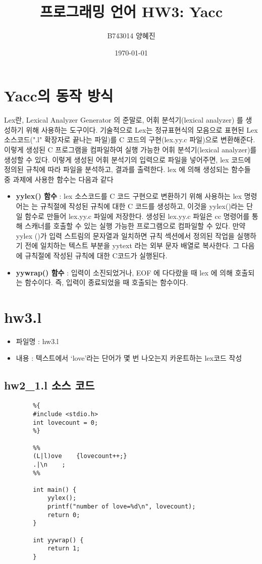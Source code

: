 \documentclass{article}
\begin{document}
\title{프로그래밍 언어 HW3: Yacc}
\author{B743014 양혜진}
\date{\today}
\maketitle

\section{Yacc의 동작 방식}
Lex란, Lexical Analyzer Generator 의 준말로, 어휘 분석기(lexical analyzer) 를 생성하기 위해
사용하는 도구이다. 기술적으로 Lex는 정규표현식의 모음으로 표현된 Lex 소스코드(".l" 확장자로 끝나는 파일)를
C 코드의 구현(lex.yy.c 파일)으로 변환해준다. 이렇게 생성된 C 프로그램을 컴파일하여 실행 가능한
어휘 분석기(lexical analyzer)를 생성할 수 있다. 이렇게 생성된 어휘 분석기의 입력으로
파일을 넣어주면, lex 코드에 정의된 규칙에 따라 파일을 분석하고, 결과를 출력한다.
lex 에 의해 생성되는 함수들 중 과제에 사용한 함수는 다음과 같다

\begin{itemize}
	\item {\bf yylex() 함수} : lex 소스코드를 C 코드 구현으로 변환하기 위해
	사용하는 lex 명령어는 는 규칙절에 작성된 규칙에 대한 C 코드를 생성하고, 이것을
	yylex()라는 단일 함수로 만들어 lex.yy.c 파일에 저장한다. 생성된
	lex.yy.c 파일은 cc 명령어를 통해 스캐너를 호출할 수 있는 실행 가능한
	프로그램으로 컴파일할 수 있다. 만약 yylex ()가 입력 스트림의 문자열과 일치하면 
	규칙 섹션에서 정의된 작업을 실행하기 전에 일치하는 텍스트 부분을 yytext 라는
	외부 문자 배열로 복사한다. 그 다음에 규칙절에 작성된 규칙에 대한 C코드가 실행된다.
	\item {\bf yywrap() 함수} : 입력이 소진되었거나, EOF 에 다다랐을 때
	lex 에 의해 호출되는 함수이다. 즉, 입력이 종료되었을 때 호출되는 함수이다.
\end{itemize}


\section{hw3.l}

\begin{itemize}
	\item 파일명 : hw3.l
	\item 내용 : 텍스트에서 ‘love’라는 단어가 몇 번 나오는지 카운트하는 lex코드 작성
\end{itemize}

\subsection{hw2\_1.l 소스 코드}
\begin{lstlisting}
		%{
		#include <stdio.h>
		int lovecount = 0;
		%}
		
		%%
		(L|l)ove	{lovecount++;}
		.|\n	;
		%%
		
		int main() {
			yylex();
			printf("number of love=%d\n", lovecount);
			return 0;
		}
		
		int yywrap() {
			return 1;
		}
\end{lstlisting}
\end{document}
